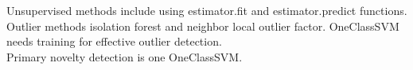 \documentclass[11pt]{scrartcl} %
\begin{document}
Unsupervised methods include using estimator.fit and estimator.predict functions. Outlier methods
isolation forest and neighbor local outlier factor. OneClassSVM needs training for effective 
outlier detection.\\

Primary novelty detection is one OneClassSVM.

\newpage

\printbibliography






\end{document}
